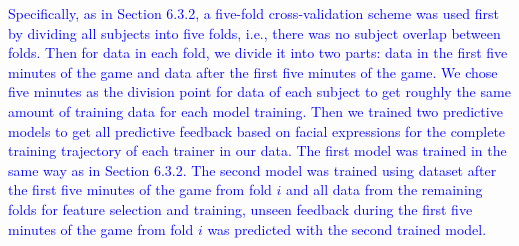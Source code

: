 \textcolor{blue}{%
Specifically, as in Section 6.3.2, a five-fold cross-validation scheme was used first by dividing all subjects into five folds, i.e., %
there was no subject overlap between folds. Then for data in each fold, we divide it into two parts: data in the first five minutes of the game and data after the first five minutes of the game. We chose five minutes as the division point for data of each subject to get roughly the same amount of training data for each model training. 
Then we trained two predictive models to get all predictive feedback based on facial expressions for the complete training trajectory of each trainer in our data. 
The first model was trained in the same way as in Section 6.3.2.
The second model was trained using %
dataset after the first five minutes of the game from fold $i$ and all data from the remaining folds for feature selection and training, unseen feedback during the first five minutes of the game from fold $i$ was predicted with the second trained model. }%

